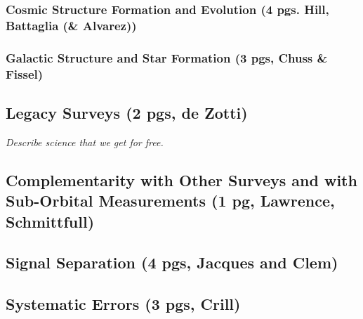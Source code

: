 \documentclass[12pt]{article}
\begin{document}
\vspace{-0.05in}



\vspace{-0.05in}


\subsubsection{Cosmic Structure Formation and Evolution (4 pgs. Hill, Battaglia (\& Alvarez))}




\subsubsection{Galactic Structure and Star Formation (3 pgs, Chuss \& Fissel)}




\subsection{Legacy Surveys (2 pgs, de Zotti)} 

{\it Describe science that we get for free. }




\subsection{Complementarity with Other Surveys and with Sub-Orbital Measurements (1 pg, Lawrence, Schmittfull)} 




\subsection{Signal Separation (4 pgs, Jacques and Clem)}




\subsection{Systematic Errors (3 pgs, Crill)}
\end{document}
